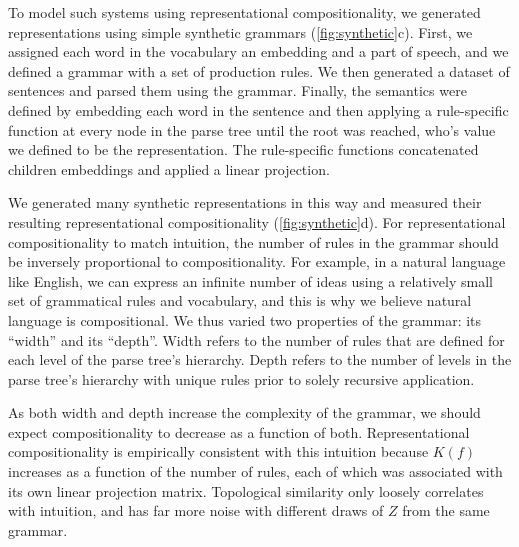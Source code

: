 \documentclass{article} %
\newcommand{\comp}{representational compositionality}
\newcommand{\Comp}{Representational compositionality}
\begin{document}
To model such systems using \comp{}, we generated representations using simple synthetic grammars (\cref{fig:synthetic}c). First, we assigned each word in the vocabulary an embedding and a part of speech, and we defined a grammar with a set of production rules. We then generated a dataset of sentences and parsed them using the grammar. Finally, the semantics were defined by embedding each word in the sentence and then applying a rule-specific function at every node in the parse tree until the root was reached, who's value we defined to be the representation. The rule-specific functions concatenated children embeddings and applied a linear projection.

We generated many synthetic representations in this way and measured their resulting \comp{} (\cref{fig:synthetic}d). For \comp{} to match intuition, the number of rules in the grammar should be inversely proportional to compositionality. For example, in a natural language like English, we can express an infinite number of ideas using a relatively small set of grammatical rules and vocabulary, and this is why we believe natural language is compositional. We thus varied two properties of the grammar: its ``width'' and its ``depth''. Width refers to the number of rules that are defined for each level of the parse tree's hierarchy. Depth refers to the number of levels in the parse tree's hierarchy with unique rules prior to solely recursive application.

As both width and depth increase the complexity of the grammar, we should expect compositionality to decrease as a function of both. \Comp{} is empirically consistent with this intuition because $K(f)$ increases as a function of the number of rules, each of which was associated with its own linear projection matrix. Topological similarity only loosely correlates with intuition, and has far more noise with different draws of $Z$ from the same grammar.

\end{document}
